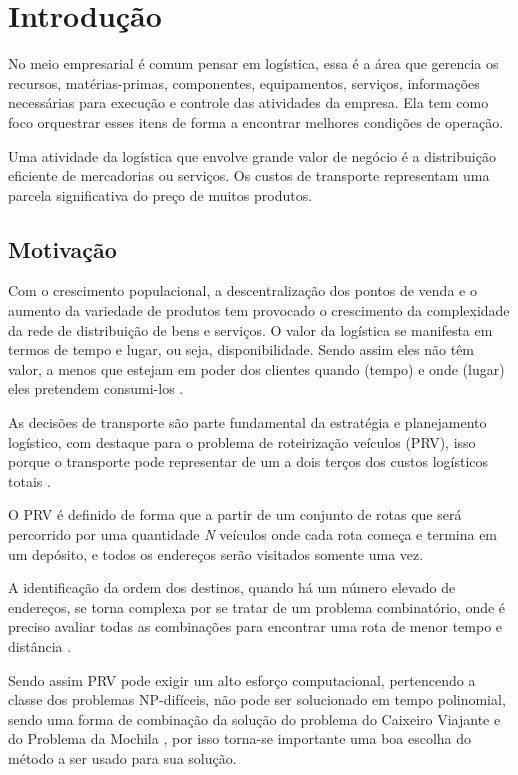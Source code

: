 \chapter[Introdução]{Introdução}

No meio empresarial é comum pensar em logística, essa é a área que gerencia os recursos, matérias-primas, componentes, equipamentos, serviços, informações necessárias para execução e controle das atividades da empresa. Ela tem como foco orquestrar esses itens de forma a encontrar melhores condições de operação.

Uma atividade da logística que envolve grande valor de negócio é a distribuição eficiente de mercadorias ou serviços. Os custos de transporte representam uma parcela significativa do preço de muitos produtos. \cite{DIAS}


\section{Motivação}

Com o crescimento populacional, a descentralização dos pontos de venda e o aumento da variedade de produtos tem provocado o crescimento da complexidade da rede de distribuição de bens e serviços. O valor da logística se manifesta em termos de tempo e lugar, ou seja, disponibilidade. Sendo assim eles não têm valor, a menos que estejam em poder dos clientes quando (tempo) e onde (lugar) eles
pretendem consumi-los \cite{TSUDA}.

As decisões de transporte são parte fundamental da estratégia e planejamento logístico, com destaque para o problema de roteirização veículos (PRV), isso porque o transporte  pode representar de um a dois terços dos custos logísticos totais \cite{Ballou, RODRIGUES}.

O PRV é definido de forma que a partir de um conjunto de rotas que será percorrido por uma quantidade \textit{N} veículos onde cada rota começa e termina em um depósito, e todos os endereços serão visitados somente uma vez. 

A identificação da ordem dos destinos, quando há um número elevado de endereços, se torna complexa por se tratar de um problema combinatório, onde é preciso avaliar todas as combinações para encontrar uma rota de menor tempo e distância \cite{RMKarp}.

Sendo assim PRV pode exigir um alto esforço computacional, pertencendo a classe dos problemas NP-difíceis, não pode ser solucionado em tempo polinomial, sendo uma forma de combinação da solução do problema do Caixeiro Viajante e do Problema da Mochila \cite{HUMBERTO}, por isso torna-se importante uma boa escolha do método a ser usado para sua solução.

